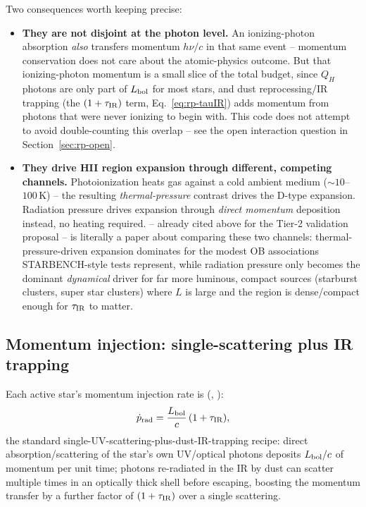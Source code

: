Two consequences worth keeping precise:
\begin{itemize}
  \item \textbf{They are not disjoint at the photon level.} An
    ionizing-photon absorption \emph{also} transfers momentum
    $h\nu/c$ in that same event -- momentum conservation does not care
    about the atomic-physics outcome. But that ionizing-photon
    momentum is a small slice of the total budget, since $Q_H$
    photons are only part of $L_{\rm bol}$ for most stars, and dust
    reprocessing/IR trapping (the $(1+\tau_{\rm IR})$ term,
    Eq.~\ref{eq:rp-tauIR}) adds momentum from photons that were never
    ionizing to begin with. This code does not attempt to avoid
    double-counting this overlap -- see the open interaction question
    in Section~\ref{sec:rp-open}.
  \item \textbf{They drive HII region expansion through different,
    competing channels.} Photoionization heats gas against a cold
    ambient medium ($\sim10$--$100\,$K) -- the resulting
    \emph{thermal-pressure} contrast drives the D-type expansion.
    Radiation pressure drives expansion through \emph{direct momentum}
    deposition instead, no heating required.
    \citet{KrumholzMatzner2009} -- already cited above for the Tier-2
    validation proposal -- is literally a paper about comparing these
    two channels: thermal-pressure-driven expansion dominates for the
    modest OB associations STARBENCH-style tests represent, while
    radiation pressure only becomes the dominant \emph{dynamical}
    driver for far more luminous, compact sources (starburst clusters,
    super star clusters) where $L$ is large and the region is
    dense/compact enough for $\tau_{\rm IR}$ to matter.
\end{itemize}

\subsection{Momentum injection: single-scattering plus IR trapping}
\label{sec:rp-momentum}

Each active star's momentum injection rate is
(,
):
\begin{equation}
  \dot p_{\rm rad} = \frac{L_{\rm bol}}{c}\,(1+\tau_{\rm IR}),
  \label{eq:rp-momentum-rate}
\end{equation}
the standard single-UV-scattering-plus-dust-IR-trapping recipe: direct
absorption/scattering of the star's own UV/optical photons deposits
$L_{\rm bol}/c$ of momentum per unit time; photons re-radiated in the
IR by dust can scatter multiple times in an optically thick shell
before escaping, boosting the momentum transfer by a further factor of
$(1+\tau_{\rm IR})$ over a single scattering.

